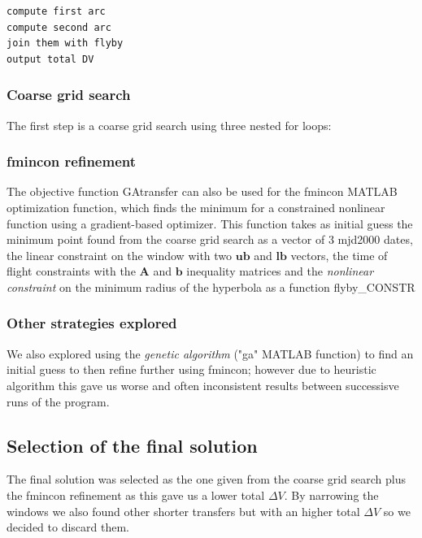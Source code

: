 \documentclass[11pt,a4paper]{report}
\renewcommand{\vec}[1]{\mathbf{#1}}
\begin{document}
\lstset{style=mystyle}
\begin{lstlisting}[frame=single,caption=GAtransfer objective function structure]  
compute first arc
compute second arc
join them with flyby
output total DV 
\end{lstlisting}


\subsubsection{Coarse grid search}
The first step is a coarse grid search using three nested for loops:\\

\lstset{style=mystyle}


\subsubsection{fmincon refinement}
The objective function GAtransfer can also be used for the fmincon MATLAB optimization function, which finds the minimum for a constrained nonlinear function using a gradient-based optimizer. This function takes as initial guess the minimum point found from the coarse grid search as a vector of 3 mjd2000 dates, the linear constraint on the window with two $\vec{ub}$ and $\vec{lb}$ vectors, the time of flight constraints with the $\vec{A}$ and $\vec{b}$ inequality matrices and the \emph{nonlinear constraint} on the minimum radius of the hyperbola as a function flyby\_CONSTR\\
\subsubsection{Other strategies explored}

We also explored using the \emph{genetic algorithm} ("ga" MATLAB function) to find an initial guess to then refine further using fmincon; however due to heuristic algorithm this gave us worse and often inconsistent results between successisve runs of the program.

\subsection{Selection of the final solution}
The final solution was selected as the one given from the coarse grid search plus the fmincon refinement as this gave us a lower total $\Delta V$. By narrowing the windows we also found other shorter transfers but with an higher total $\Delta V$ so we decided to discard them.
\end{document}
